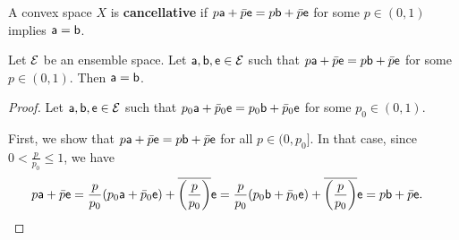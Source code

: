 \begin{mathSection}
\begin{defn}
	A convex space $X$ is \textbf{cancellative} if $p \ens[a] + \bar{p} \ens = p \ens[b] + \bar{p} \ens$ for some $p \in (0,1)$ implies $\ens[a] = \ens[b]$.
\end{defn}

\begin{thrm}\label{pm-es-ensembleSpaceCancellative}
	Let $\Ens$ be an ensemble space. Let $\ens[a], \ens[b], \ens \in \Ens$ such that $p\ens[a] + \bar{p} \ens = p \ens[b] + \bar{p} \ens$ for some $p \in (0,1)$. Then $\ens[a] = \ens[b]$.
\end{thrm}

\begin{proof}
	Let $\ens[a], \ens[b], \ens \in \Ens$ such that $p_0\ens[a] + \bar{p}_0 \ens = p_0 \ens[b] + \bar{p}_0 \ens$ for some $p_0 \in (0,1)$.
	
	First, we show that $p\ens[a] + \bar{p} \ens = p \ens[b] + \bar{p} \ens$ for all $p \in (0,p_0]$. In that case, since $0 < \frac{p}{p_0} \leq 1$, we have
	\begin{equation}
		\begin{aligned}
			p \ens[a] + \bar{p} \ens &= \frac{p}{p_0} (p_0 \ens[a] + \bar{p}_0 \ens) + \overline{\left(\frac{p}{p_0}\right)} \ens = \frac{p}{p_0} (p_0 \ens[b] + \bar{p}_0 \ens) + \overline{\left(\frac{p}{p_0}\right)} \ens = p \ens[b] + \bar{p} \ens.
		\end{aligned}
	\end{equation}
	

\end{proof}
\end{mathSection}
